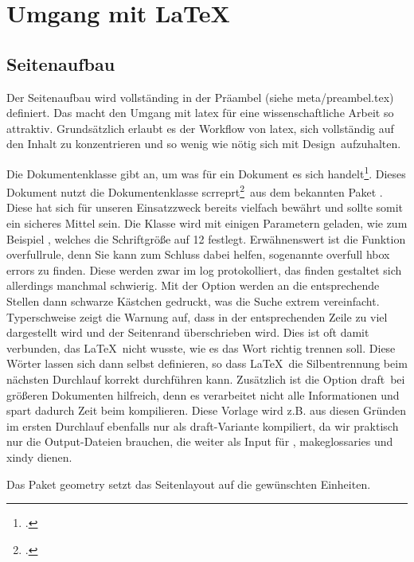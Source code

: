 \newpage

\section{Umgang mit \protect\LaTeX{}}%
\label{sec:umgang}
\subsection{Seitenaufbau}%
\label{sec:seit-aufbau}
Der Seitenaufbau wird vollständing in der Präambel (siehe meta/preambel.tex) definiert. Das macht den Umgang mit \gls{latex} für eine wissenschaftliche Arbeit so attraktiv. Grundsätzlich erlaubt es der Workflow von \gls{latex}, sich vollständig auf den Inhalt zu konzentrieren und so wenig wie nötig sich mit \glqq Design\grqq\ aufzuhalten.

Die Dokumentenklasse gibt an, um was für ein Dokument es sich handelt\footcite[Vgl. ][S. 9]{oetiker_not_2018}. Dieses Dokument nutzt die Dokumentenklasse \glqq scrreprt\grqq\footcite[S. 51]{kohm_koma_2019}\ aus dem bekannten Paket . Diese hat sich für unseren Einsatzzweck bereits vielfach bewährt und sollte somit ein sicheres Mittel sein.
Die Klasse wird mit einigen Parametern geladen, wie zum Beispiel \glqq 12pt\grqq, welches die Schriftgröße auf 12 festlegt. Erwähnenswert ist die Funktion \glqq overfullrule\grqq, denn Sie kann zum Schluss dabei helfen, sogenannte overfull hbox errors zu finden. Diese werden zwar im log protokolliert, das finden gestaltet sich allerdings manchmal schwierig. Mit der Option werden an die entsprechende Stellen dann schwarze Kästchen gedruckt, was die Suche extrem vereinfacht. Typerschweise zeigt die Warnung auf, dass
in der entsprechenden Zeile zu viel dargestellt wird und der Seitenrand überschrieben wird. Dies ist oft damit verbunden, das \LaTeX{}\ nicht wusste, wie es das Wort richtig trennen soll. Diese Wörter lassen sich dann selbst definieren, so dass \LaTeX{}\ die Silbentrennung beim nächsten Durchlauf korrekt durchführen kann.
Zusätzlich ist die Option \glqq draft\grqq\ bei größeren Dokumenten hilfreich, denn es verarbeitet nicht alle Informationen und spart dadurch Zeit beim kompilieren. Diese Vorlage wird z.B. aus diesen Gründen im ersten Durchlauf ebenfalls nur als \glqq draft\grqq-Variante kompiliert, da wir praktisch nur die Output-Dateien brauchen, die weiter als Input für , makeglossaries und xindy dienen.

Das Paket geometry setzt das Seitenlayout auf die gewünschten Einheiten.

